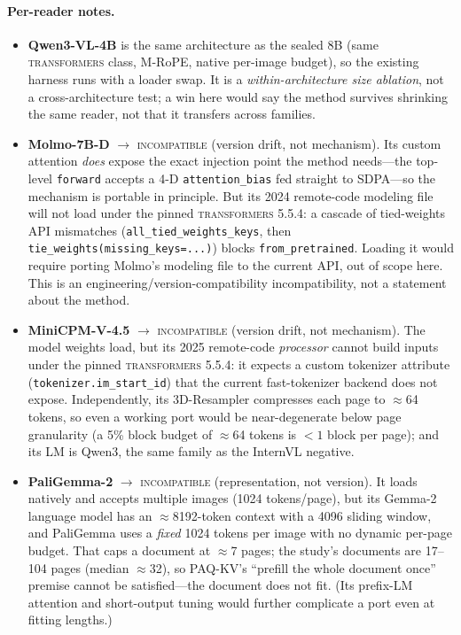 \documentclass[letterpaper]{article} %
\newcommand{\paqc}{\textsc{PAQ-KV}}
\begin{document}
\paragraph{Per-reader notes.}
\begin{itemize}
\item \textbf{Qwen3-VL-4B} is the same architecture as the sealed 8B (same \textsc{transformers} class, M-RoPE, native
per-image budget), so the existing harness runs with a loader swap. It is a \emph{within-architecture size ablation},
not a cross-architecture test; a win here would say the method survives shrinking the same reader, not that it
transfers across families.
\item \textbf{Molmo-7B-D} $\to$ \textsc{incompatible} (version drift, not mechanism). Its custom attention
\emph{does} expose the exact injection point the method needs---the top-level \texttt{forward} accepts a 4-D
\texttt{attention\_bias} fed straight to SDPA---so the mechanism is portable in principle. But its 2024 remote-code
modeling file will not load under the pinned \textsc{transformers} 5.5.4: a cascade of tied-weights API mismatches
(\texttt{all\_tied\_weights\_keys}, then \texttt{tie\_weights(missing\_keys=...)}) blocks \texttt{from\_pretrained}.
Loading it would require porting Molmo's modeling file to the current API, out of scope here. This is an
engineering/version-compatibility incompatibility, not a statement about the method.
\item \textbf{MiniCPM-V-4.5} $\to$ \textsc{incompatible} (version drift, not mechanism). The model weights load, but
its 2025 remote-code \emph{processor} cannot build inputs under the pinned \textsc{transformers} 5.5.4: it expects a
custom tokenizer attribute (\texttt{tokenizer.im\_start\_id}) that the current fast-tokenizer backend does not expose.
Independently, its 3D-Resampler compresses each page to $\approx$64 tokens, so even a working port would be
near-degenerate below page granularity (a 5\% block budget of $\approx$64 tokens is $<1$ block per page); and its LM
is Qwen3, the same family as the InternVL negative.
\item \textbf{PaliGemma-2} $\to$ \textsc{incompatible} (representation, not version). It loads natively and accepts
multiple images (1024 tokens/page), but its Gemma-2 language model has an $\approx$8192-token context with a 4096
sliding window, and PaliGemma uses a \emph{fixed} 1024 tokens per image with no dynamic per-page budget. That caps a
document at $\approx$7 pages; the study's documents are 17--104 pages (median $\approx$32), so \paqc{}'s ``prefill the
whole document once'' premise cannot be satisfied---the document does not fit. (Its prefix-LM attention and
short-output tuning would further complicate a port even at fitting lengths.)
\end{itemize}
\end{document}
